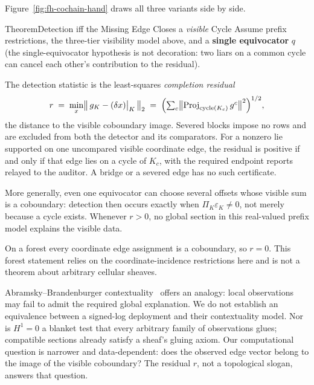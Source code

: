 \documentclass[11pt,a4paper]{article}
\theoremstyle{definition}
\theoremstyle{remark}
\begin{document}
Figure~\ref{fig:fh-cochain-hand} draws all three variants side by side.



\begin{pdclaim}{Theorem}{Detection iff the Missing Edge Closes a \emph{visible} Cycle}
\setlength{\parskip}{4pt plus 1pt}
\label{thm:sheaf-equivocation}
Assume prefix restrictions, the three-tier visibility model above, and a \textbf{single equivocator} $q$ (the single-equivocator hypothesis is not decoration: two liars on a common cycle can cancel each other's contribution to the residual). 

The detection statistic is the least-squares \emph{completion residual}
\begin{equation}
r \;=\; \min_x \bigl\| \, g_K - (\delta x)\big|_K \, \bigr\|_2
\;=\; \Bigl( \textstyle\sum_c \bigl\| \mathrm{Proj}_{\mathrm{cycle}(K_c)}\, g^c \bigr\|^2 \Bigr)^{1/2},
\end{equation}
the distance to the visible coboundary image. Severed blocks impose no rows
and are excluded from both the detector and its comparators.
For a nonzero lie supported on one uncompared visible coordinate edge, the
residual is positive if and only if that edge lies on a cycle of $K_c$, with
the required endpoint reports relayed to the auditor. A bridge or a severed edge
has no such certificate. 

More generally, even one equivocator can choose
several offsets whose visible sum is a coboundary: detection then occurs
exactly when $\Pi_K\varepsilon_K\ne0$, not merely because a cycle exists.
Whenever $r>0$, no global section in this real-valued prefix model explains
the visible data. 

On a forest every coordinate edge assignment is a coboundary,
so $r=0$. This forest statement relies on the coordinate-incidence restrictions
here and is not a theorem about arbitrary cellular sheaves.
\end{pdclaim}



\ifdefined\pdswisslandmarkplate
\begin{figure}[p]
  \centering
\end{figure}
\fi

\noindent Abramsky--Brandenburger contextuality~
offers an analogy: local observations may fail to admit the required global
explanation. We do not establish an equivalence between a signed-log deployment
and their contextuality model. Nor is $H^1=0$ a blanket test that every arbitrary
family of observations glues; compatible sections already satisfy a sheaf's
gluing axiom. Our computational question is narrower and data-dependent:
does the observed edge vector belong to the image of the visible coboundary?
The residual $r$, not a topological slogan, answers that question.
\end{document}

